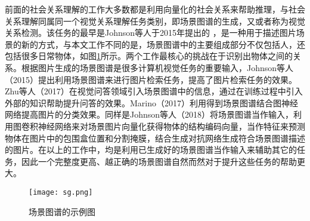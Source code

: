 前面的社会关系理解的工作大多数都是利用向量化的社会关系来帮助推理，与社会关系理解同属同一个视觉关系理解任务类别，即场景图谱的生成，又或者称为视觉关系检测。该任务的最早是Johnson等人于2015年提出的
\cite{johnson2015image}，是一种用于描述图片场景的新的方式，与本文工作不同的是，场景图谱中的主要组成部分不仅包括人，还包括很多日常物体，如图\ref{fig:sg-example}所示。两个工作最核心的挑战在于识别出物体之间的关系。根据图片生成的场景图谱是很多计算机视觉任务的重要输入，Johnson等人（2015）\cite{johnson2015image}提出利用场景图谱来进行图片检索任务，提高了图片检索任务的效果。Zhu等人（2017）\cite{zhu2017knowledge}在视觉问答领域引入场景图谱中的信息，通过在训练过程中引入外部的知识帮助提升问答的效果。Marino（2017）\cite{marino2017the}利用得到场景图谱结合图神经网络提高图片的分类效果。同样是Johnson等人（2018）\cite{johnson2018image}将场景图谱当作输入，利用图卷积神经网络来对场景图片向量化获得物体的结构编码向量，当作特征来预测物体在图片中的包围盒位置和分割掩膜，结合生成对抗网络生成符合场景图谱描述的图片。在以上的工作中，均是利用已生成好的场景图谱当作输入来辅助其它的任务，因此一个完整度更高、越正确的场景图谱自然而然对于提升这些任务的帮助更大。
\begin{figure}[htpb]
	\centering
	\texttt{[image: sg.png]}
    \caption{场景图谱\cite{xu2017scene}的示例图}
	\vspace*{-3.5mm}
	\label{fig:sg-example}
\end{figure}

